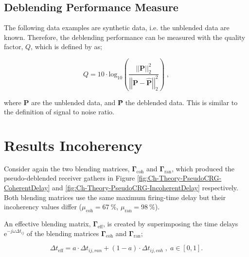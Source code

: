 \subsection*{Deblending Performance Measure}

The following data examples are synthetic data, i.e. the unblended data are known. Therefore, the deblending performance can be measured with the quality factor, $Q$, which is defined by \citet{IbrahimQuality} as;

\begin{equation}
	Q = 10 \cdot \mathrm{log_{10}} \left( \frac{\left|\left|\mathbf{P}\right|\right| _2 ^2}{\left|\left|\mathbf{P - \hat{P}}\right|\right| _2 ^2} \right) \;,	
\end{equation}

where $\mathbf{P}$ are the unblended data, and \textbf{\^{P}} the deblended data. This is similar to the definition of signal to noise ratio. 





\section{Results Incoherency}

Consider again the two blending matrices, $\mathbf{\Gamma}_{\mathrm{coh}}$ and $\mathbf{\Gamma}_{\mathrm{ran}}$, which produced the pseudo-deblended receiver gathers in Figure \ref{fig:Ch-Theory-PseudoCRG-CoherentDelay} and \ref{fig:Ch-Theory-PseudoCRG-IncoherentDelay} respectively. Both blending matrices use the same maximum firing-time delay but their incoherency values differ ($\mu_{\mathrm{coh}} = \SI{67}{\percent}$, $\mu_{\mathrm{ran}} = \SI{98}{\percent}$). 

An effective blending matrix, $\mathbf{\Gamma}_{\mathrm{eff}}$, is created by superimposing the time delays $\mathrm{e}^{-j \omega \Delta t_{ij}}$ of the blending matrices $\mathbf{\Gamma}_{\mathrm{coh}}$ and $\mathbf{\Gamma}_{\mathrm{ran}}$;

\begin{equation}
	\Delta t_{\mathrm{eff}} = a \cdot \Delta t_{ij,ran} + (1 - a) \cdot \Delta t_{ij,coh}\;, \; a \in [0,1].
	\label{eq:Ch-Incoherency-EffectiveG}
\end{equation}



